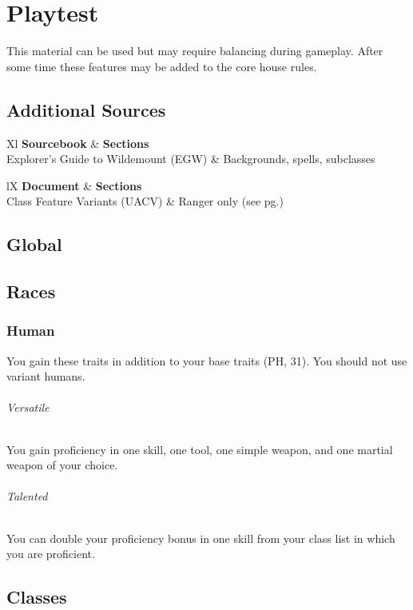 \documentclass[House_Rules.tex]{subfiles}
\begin{document}
\chapter{Playtest}
This material can be used but may require balancing during gameplay. After some time these features may be added to the core house rules.

\section{Additional Sources}

\begin{DndTable}[header=Sourcebooks: Partial]{Xl}
    \textbf{Sourcebook} & \textbf{Sections} \\
    Explorer's Guide to Wildemount (EGW) & Backgrounds, spells, subclasses \\
\end{DndTable}

\begin{DndTable}[header=Unearthed Arcana]{lX}
    \textbf{Document} & \textbf{Sections} \\
    Class Feature Variants (UACV) & Ranger only (see pg.\pageref{variantRanger}) \\
\end{DndTable}

\section{Global}




\section{Races}

\subsection{Human}

You gain these traits in addition to your base traits (PH, 31). You should not use variant humans.

\subparagraph{Versatile} You gain proficiency in one skill, one tool, one simple weapon, and one martial weapon of your choice.
\subparagraph{Talented} You can double your proficiency bonus in one skill from your class list in which you are proficient.




\section{Classes}
\end{document}
